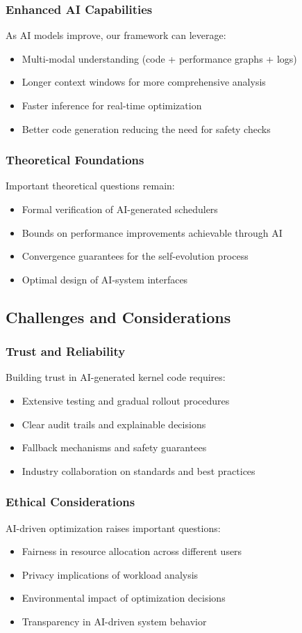 \subsubsection{Enhanced AI Capabilities}
As AI models improve, our framework can leverage:
\begin{itemize}
\item Multi-modal understanding (code + performance graphs + logs)
\item Longer context windows for more comprehensive analysis
\item Faster inference for real-time optimization
\item Better code generation reducing the need for safety checks
\end{itemize}

\subsubsection{Theoretical Foundations}
Important theoretical questions remain:
\begin{itemize}
\item Formal verification of AI-generated schedulers
\item Bounds on performance improvements achievable through AI
\item Convergence guarantees for the self-evolution process
\item Optimal design of AI-system interfaces
\end{itemize}

\subsection{Challenges and Considerations}

\subsubsection{Trust and Reliability}
Building trust in AI-generated kernel code requires:
\begin{itemize}
\item Extensive testing and gradual rollout procedures
\item Clear audit trails and explainable decisions
\item Fallback mechanisms and safety guarantees
\item Industry collaboration on standards and best practices
\end{itemize}

\subsubsection{Ethical Considerations}
AI-driven optimization raises important questions:
\begin{itemize}
\item Fairness in resource allocation across different users
\item Privacy implications of workload analysis
\item Environmental impact of optimization decisions
\item Transparency in AI-driven system behavior
\end{itemize}

